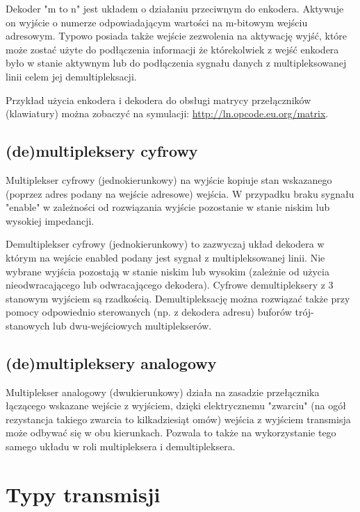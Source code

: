 Dekoder "m to n" jest układem o działaniu przeciwnym do enkodera. Aktywuje on wyjście o numerze odpowiadającym wartości na m-bitowym wejściu adresowym. Typowo posiada także wejście zezwolenia na aktywację wyjść, które może zostać użyte do podłączenia informacji że którekolwiek z wejść enkodera było w stanie aktywnym lub do podłączenia sygnału danych z multipleksowanej linii celem jej demultipleksacji.

Przykład użycia enkodera i dekodera do obsługi matrycy przełączników (klawiatury) można zobaczyć na symulacji: \url{http://ln.opcode.eu.org/matrix}.

\subsection{(de)multipleksery cyfrowy}

Multiplekser cyfrowy (jednokierunkowy) na wyjście kopiuje stan wskazanego (poprzez adres podany na wejście adresowe) wejścia. W przypadku braku sygnału "enable" w zależności od rozwiązania wyjście pozostanie w stanie niskim lub wysokiej impedancji.

Demultiplekser cyfrowy (jednokierunkowy) to zazwyczaj układ dekodera w którym na wejście enabled podany jest sygnał z multipleksowanej linii. Nie wybrane wyjścia pozostają w stanie niskim lub wysokim (zależnie od użycia nieodwracającego lub odwracającego dekodera). Cyfrowe demultipleksery z 3 stanowym wyjściem są rzadkością. Demultipleksację można rozwiązać także przy pomocy odpowiednio sterowanych (np. z dekodera adresu) buforów trój-stanowych lub dwu-wejściowych multiplekserów.

\subsection{(de)multipleksery analogowy}

Multiplekser analogowy (dwukierunkowy) działa na zasadzie przełącznika łączącego wskazane wejście z wyjściem, dzięki elektrycznemu "zwarciu" (na ogół rezystancja takiego zwarcia to kilkadziesiąt omów) wejścia z wyjściem transmisja może odbywać się w obu kierunkach. Pozwala to także na wykorzystanie tego samego układu w roli multipleksera i demultipleksera.


\section{Typy transmisji}

